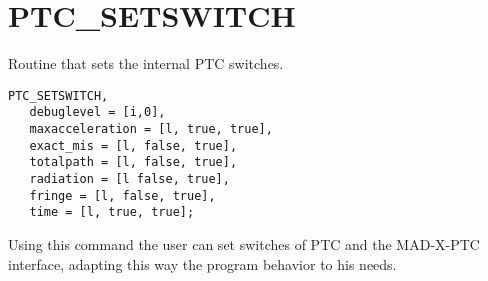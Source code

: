 
\section{PTC\_SETSWITCH}

Routine that sets the internal PTC switches.

\begin{verbatim}
PTC_SETSWITCH,
   debuglevel = [i,0], 
   maxacceleration = [l, true, true],
   exact_mis = [l, false, true],
   totalpath = [l, false, true],
   radiation = [l false, true],
   fringe = [l, false, true],
   time = [l, true, true];
\end{verbatim}

Using this command the user can set switches of PTC and the MAD-X-PTC
interface, adapting this way the program behavior to his needs.   

